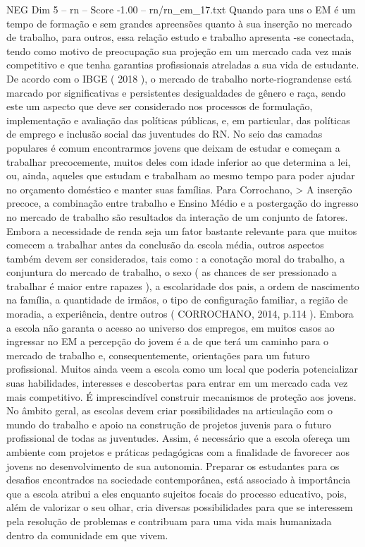 \begin{textsample}{NEG Dim 5 – rn – Score -1.00 – rn/rn\_em\_17.txt}
Quando para uns o EM é um tempo de formação e sem grandes apreensões quanto à sua inserção no mercado de trabalho, para outros, essa relação estudo e trabalho apresenta -se conectada, tendo como motivo de preocupação sua projeção em um mercado cada vez mais competitivo e que tenha garantias profissionais atreladas a sua vida de estudante.
De acordo com o IBGE ( 2018 ), o mercado de trabalho norte-riograndense está marcado por significativas e persistentes desigualdades de gênero e raça, sendo este um aspecto que deve ser considerado nos processos de formulação, implementação e avaliação das políticas públicas, e, em particular, das políticas de emprego e inclusão social das juventudes do RN.
No seio das camadas populares é comum encontrarmos jovens que deixam de estudar e começam a trabalhar precocemente, muitos deles com idade inferior ao que determina a lei, ou, ainda, aqueles que estudam e trabalham ao mesmo tempo para poder ajudar no orçamento doméstico e manter suas famílias.
Para Corrochano, > A inserção precoce, a combinação entre trabalho e Ensino Médio e a postergação do ingresso no mercado de trabalho são resultados da interação de um conjunto de fatores.
Embora a necessidade de renda seja um fator bastante relevante para que muitos comecem a trabalhar antes da conclusão da escola média, outros aspectos também devem ser considerados, tais como : a conotação moral do trabalho, a conjuntura do mercado de trabalho, o sexo ( as chances de ser pressionado a trabalhar é maior entre rapazes ), a escolaridade dos pais, a ordem de nascimento na família, a quantidade de irmãos, o tipo de configuração familiar, a região de moradia, a experiência, dentre outros ( CORROCHANO, 2014, p.114 ).
Embora a escola não garanta o acesso ao universo dos empregos, em muitos casos ao ingressar no EM a percepção do jovem é a de que terá um caminho para o mercado de trabalho e, consequentemente, orientações para um futuro profissional.
Muitos ainda veem a escola como um local que poderia potencializar suas habilidades, interesses e descobertas para entrar em um mercado cada vez mais competitivo.
É imprescindível construir mecanismos de proteção aos jovens.
No âmbito geral, as escolas devem criar possibilidades na articulação com o mundo do trabalho e apoio na construção de projetos juvenis para o futuro profissional de todas as juventudes.
Assim, é necessário que a escola ofereça um ambiente com projetos e práticas pedagógicas com a finalidade de favorecer aos jovens no desenvolvimento de sua autonomia.
Preparar os estudantes para os desafios encontrados na sociedade contemporânea, está associado à importância que a escola atribui a eles enquanto sujeitos focais do processo educativo, pois, além de valorizar o seu olhar, cria diversas possibilidades para que se interessem pela resolução de problemas e contribuam para uma vida mais humanizada dentro da comunidade em que vivem.

\end{textsample}
